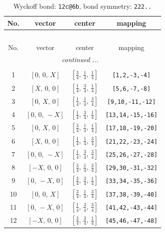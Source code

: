 \documentclass[fleqn,8pt]{jsarticle}
\begin{document}
\renewcommand{\arraystretch}{1.2}
\begin{longtable}{cccc}
\caption{Wyckoff bond: {\tt 12c@6b}, bond symmetry: {\tt 222..}}
 \\
 \hline \hline
No. & vector & center & mapping \\ \hline \endfirsthead

\multicolumn{3}{l}{\tablename\ \thetable{}} \\
 \hline \hline
No. & vector & center & mapping \\ \hline \endhead

 \hline \hline
\multicolumn{3}{r}{\footnotesize\it continued ...} \\ \endfoot

 \hline \hline
\multicolumn{3}{r}{} \\ \endlastfoot

1 & $\left[ 0,\, 0,\, X \right]$ & $\left[ \frac{3}{4},\, \frac{1}{4},\, \frac{1}{4} \right]$ & {\tt [1,2,-3,-4]} \\ \hline
2 & $\left[ X,\, 0,\, 0 \right]$ & $\left[ \frac{1}{4},\, \frac{3}{4},\, \frac{1}{4} \right]$ & {\tt [5,6,-7,-8]} \\ \hline
3 & $\left[ 0,\, X,\, 0 \right]$ & $\left[ \frac{1}{4},\, \frac{1}{4},\, \frac{3}{4} \right]$ & {\tt [9,10,-11,-12]} \\ \hline
4 & $\left[ 0,\, 0,\, - X \right]$ & $\left[ \frac{1}{4},\, \frac{3}{4},\, \frac{1}{4} \right]$ & {\tt [13,14,-15,-16]} \\ \hline
5 & $\left[ 0,\, X,\, 0 \right]$ & $\left[ \frac{3}{4},\, \frac{1}{4},\, \frac{1}{4} \right]$ & {\tt [17,18,-19,-20]} \\ \hline
6 & $\left[ X,\, 0,\, 0 \right]$ & $\left[ \frac{1}{4},\, \frac{1}{4},\, \frac{3}{4} \right]$ & {\tt [21,22,-23,-24]} \\ \hline
7 & $\left[ 0,\, 0,\, - X \right]$ & $\left[ \frac{1}{4},\, \frac{3}{4},\, \frac{3}{4} \right]$ & {\tt [25,26,-27,-28]} \\ \hline
8 & $\left[ - X,\, 0,\, 0 \right]$ & $\left[ \frac{3}{4},\, \frac{1}{4},\, \frac{3}{4} \right]$ & {\tt [29,30,-31,-32]} \\ \hline
9 & $\left[ 0,\, - X,\, 0 \right]$ & $\left[ \frac{3}{4},\, \frac{3}{4},\, \frac{1}{4} \right]$ & {\tt [33,34,-35,-36]} \\ \hline
10 & $\left[ 0,\, 0,\, X \right]$ & $\left[ \frac{3}{4},\, \frac{1}{4},\, \frac{3}{4} \right]$ & {\tt [37,38,-39,-40]} \\ \hline
11 & $\left[ 0,\, - X,\, 0 \right]$ & $\left[ \frac{1}{4},\, \frac{3}{4},\, \frac{3}{4} \right]$ & {\tt [41,42,-43,-44]} \\ \hline
12 & $\left[ - X,\, 0,\, 0 \right]$ & $\left[ \frac{3}{4},\, \frac{3}{4},\, \frac{1}{4} \right]$ & {\tt [45,46,-47,-48]} \\
\end{longtable}
\end{document}
